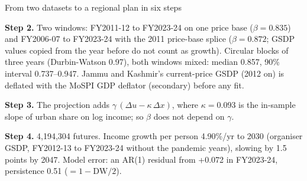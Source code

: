 \documentclass[aspectratio=169,10pt,t]{beamer}
\begin{document}
\begin{frame}[label=s6]{From two datasets to a regional plan in six steps}
{\textbf{Step 2.} Two windows: FY2011-12 to FY2023-24 on one price base ($\beta = 0.835$) and FY2006-07 to FY2023-24 with the 2011 price-base splice ($\beta = 0.872$; GSDP values copied from the year before do not count as growth). Circular blocks of three years (Durbin-Watson 0.97), both windows mixed: median 0.857, 90\% interval 0.737--0.947. Jammu and Kashmir's current-price GSDP (2012 on) is deflated with the MoSPI GDP deflator (secondary) before any fit.\par\medskip
\textbf{Step 3.} The projection adds $\gamma\,(\Delta u - \kappa\,\Delta x)$, where $\kappa = 0.093$ is the in-sample slope of urban share on log income; so $\beta$ does not depend on $\gamma$.\par\medskip
\textbf{Step 4.} 4,194,304 futures. Income growth per person 4.90\%/yr to 2030 (organiser GSDP, FY2012-13 to FY2023-24 without the pandemic years), slowing by 1.5 points by 2047. Model error: an AR(1) residual from +0.072 in FY2023-24, persistence 0.51 ($= 1 - \mathrm{DW}/2$).}
\end{frame}
\end{document}
